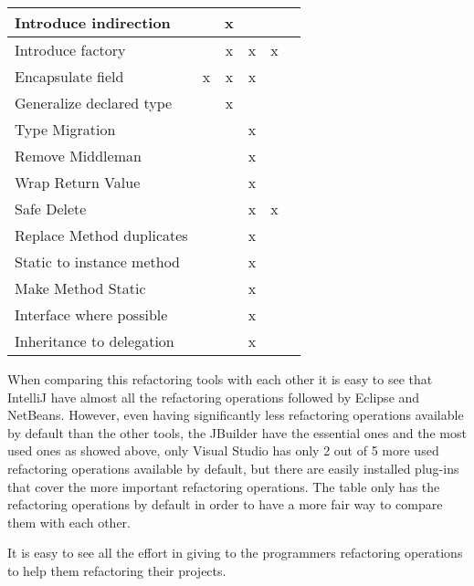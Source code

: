\begin{table}[htbp]
\begin{tabular}{|l|c|c|c|c|c|}
Introduce indirection     &               & x       &          &          &          \\ \hline
Introduce factory         &               & x       & x        & x        &          \\ \hline
Encapsulate field         & x             & x       & x        &          &          \\ \hline
Generalize declared type  &               & x       &          &          &          \\ \hline
Type Migration            &               &         & x        &          &          \\ \hline
Remove Middleman          &               &         & x        &          &          \\ \hline
Wrap Return Value         &               &         & x        &          &          \\ \hline
Safe Delete               &               &         & x        & x        &          \\ \hline
Replace Method duplicates &               &         & x        &          &          \\ \hline
Static to instance method &               &         & x        &          &          \\ \hline
Make Method Static        &               &         & x        &          &          \\ \hline
Interface where possible  &               &         & x        &          &          \\ \hline
Inheritance to delegation &               &         & x        &          &          \\ \hline
\end{tabular}
\end{table}


When comparing this refactoring tools with each other it is easy to see that IntelliJ have almost all the refactoring operations followed by Eclipse and NetBeans.
However, even having significantly less refactoring operations available by default than the other tools, the JBuilder have the essential ones and the most used ones as showed above, only Visual Studio has only 2 out of 5 more used refactoring operations available by default, but there are easily installed plug-ins that cover the more important refactoring operations. The table only has the refactoring operations by default in order to have a more fair way to compare them with each other.

It is easy to see all the effort in giving to the programmers refactoring operations to help them refactoring their projects.

 